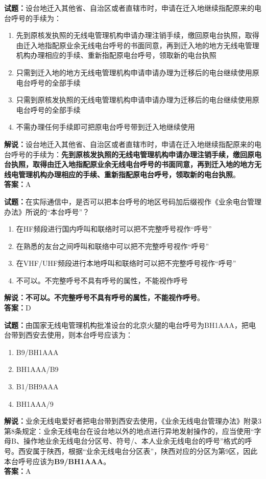 \documentclass{ctexbook}
\begin{document}
\textbf{试题：}设台地迁入其他省、自治区或者直辖市时，申请在迁入地继续指配原来的电台呼号的手续为：
\begin{enumerate}[leftmargin=3em]
  \item 先到原核发执照的无线电管理机构申请办理注销手续，缴回原电台执照，取得由迁入地指配原业余无线电台呼号的书面同意，再到迁入地的地方无线电管理机构办理相应的手续、重新指配原电台呼号，领取新的电台执照
  \item 只需到迁入地的地方无线电管理机构申请申请办理为迁移后的电台继续使用原电台呼号的全部手续
  \item 只需到原核发执照的无线电管理机构申请申请办理为迁移后的电台继续使用原电台呼号的全部手续
  \item 不需办理任何手续即可把原电台呼号带到迁入地继续使用
\end{enumerate}
\noindent\textbf{解说：}设台地迁入其他省、自治区或者直辖市时，申请在迁入地继续指配原来的电台呼号的手续为：\textbf{先到原核发执照的无线电管理机构申请办理注销手续，缴回原电台执照，取得由迁入地指配原业余无线电台呼号的书面同意，再到迁入地的地方无线电管理机构办理相应的手续、重新指配原电台呼号，领取新的电台执照}。\\\noindent\textbf{答案：}A

\vspace{1em}

\textbf{试题：}在实际通信中，是否可以把本台呼号的地区号码加后缀视作《业余电台管理办法》所说的“本台呼号”？
\begin{enumerate}[leftmargin=3em]
  \item 在HF频段进行国内呼叫和联络时可以把不完整呼号视作“呼号”
  \item 在熟悉的友台之间呼叫和联络中可以把不完整呼号视作“呼号”
  \item 在VHF/UHF频段进行本地呼叫和联络时可以把不完整呼号视作“呼号”
  \item 不可以。不完整呼号不具有呼号的属性，不能视作呼号
\end{enumerate}
\textbf{解说：不可以。不完整呼号不具有呼号的属性，不能视作呼号}。\\\noindent\textbf{答案：}D

\vspace{1em}

\textbf{试题：}由国家无线电管理机构批准设台的北京火腿的电台呼号为BH1AAA，把电台带到西安去使用，则本台呼号应该为：
\begin{enumerate}[leftmargin=3em]
  \item B9/BH1AAA
  \item BH1AAA/B9
  \item B1/BH9AAA
  \item BH1AAA/9
\end{enumerate}
\noindent\textbf{解说：}业余无线电爱好者把电台带到西安去使用，《业余无线电台管理办法》附录3第8条规定：业余无线电台在设台地以外的地点进行异地发射操作的，应当使用“字母B、操作地业余无线电台分区号、符号/、本人业余无线电台的呼号”格式的呼号。西安属于陕西，根据“业余无线电台分区表”，陕西对应的分区为第9区，因此本台呼号应该为\textbf{B9/BH1AAA}。\\\noindent\textbf{答案：}A
\end{document}
